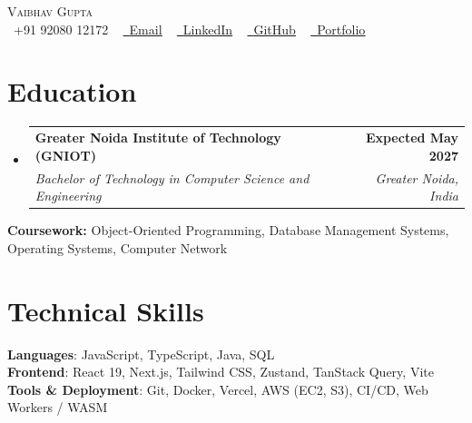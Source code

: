 \documentclass[letterpaper,10pt]{article}
\makeatletter
\newcommand{\resumeSubheading}[4]{
  \vspace{-2pt}\item
    \begin{tabular*}{1.0\textwidth}[t]{l@{\extracolsep{\fill}}r}
      \textbf{#1} & \textbf{\small #2} \\
      \textit{\small#3} & \textit{\small #4} \\
    \end{tabular*}\vspace{-7pt}
}
\newcommand{\resumeSubHeadingListStart}{\begin{itemize}[leftmargin=0.0in, label={}]}
\newcommand{\resumeSubHeadingListEnd}{\end{itemize}}
\makeatother
\begin{document}

\begin{center}
    {\Huge \scshape Vaibhav Gupta} \\ \vspace{1pt}
    \small \raisebox{-0.1\height}\faPhone\ +91 92080 12172 ~
    \href{mailto:vaibhv19.business@gmail.com}{\raisebox{-0.2\height}\faEnvelope\ \underline{Email}} ~
    \href{https://linkedin.com/in/vaibhv19}{\raisebox{-0.2\height}\faLinkedin\ \underline{LinkedIn}} ~
    \href{https://github.com/vaibhv19}{\raisebox{-0.2\height}\faGithub\ \underline{GitHub}} ~
    \href{https://vaibhv19.dev}{\raisebox{-0.2\height}\faGlobe\ \underline{Portfolio}}
    \vspace{-8pt}
\end{center}

\section{Education}
  \resumeSubHeadingListStart
    \resumeSubheading
      {Greater Noida Institute of Technology (GNIOT)}{Expected May 2027}
      {Bachelor of Technology in Computer Science and Engineering}{Greater Noida, India}
  \resumeSubHeadingListEnd
  \vspace{-4pt}
  \begin{itemize}[leftmargin=0in, label={}]
    \small{\item{\textbf{Coursework:} Object-Oriented Programming, Database Management Systems, Operating Systems, Computer Network}}
    \vspace{-10pt}
\end{itemize}

\section{Technical Skills}
 \begin{itemize}[leftmargin=0in, label={}]
    \small{\item{
     \textbf{Languages}{: JavaScript, TypeScript, Java, SQL} \\
     \textbf{Frontend}{: React 19, Next.js, Tailwind CSS, Zustand, TanStack Query, Vite} \\
     \textbf{Tools \& Deployment}{: Git, Docker, Vercel, AWS (EC2, S3), CI/CD, Web Workers / WASM} \\
    }}
 \end{itemize}
 \vspace{-12pt}
\end{document}
